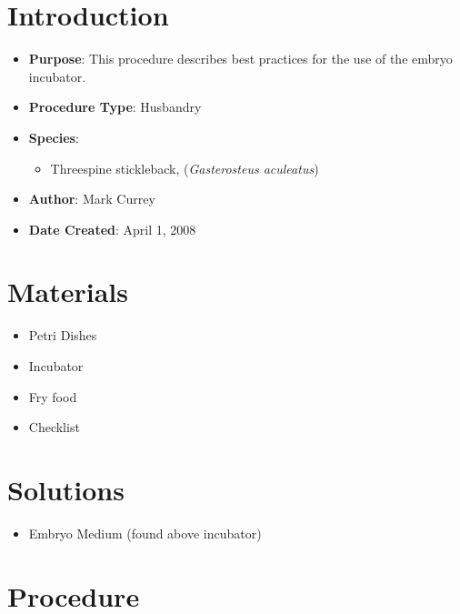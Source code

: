 \documentclass[
  letterpaper,
  DIV=11,
  numbers=noendperiod]{scrreprt}
\providecommand{\tightlist}{%
  \setlength{\itemsep}{0pt}\setlength{\parskip}{0pt}}\usepackage{longtable,booktabs,array}
\begin{document}
\hypertarget{introduction-42}{%
\section{Introduction}\label{introduction-42}}

\begin{itemize}
\tightlist
\item
  \textbf{Purpose}: This procedure describes best practices for the use
  of the embryo incubator.
\item
  \textbf{Procedure Type}: Husbandry
\item
  \textbf{Species}:

  \begin{itemize}
  \tightlist
  \item
    Threespine stickleback, (\emph{Gasterosteus aculeatus})
  \end{itemize}
\item
  \textbf{Author}: Mark Currey
\item
  \textbf{Date Created}: April 1, 2008
\end{itemize}

\hypertarget{materials-40}{%
\section{Materials}\label{materials-40}}

\begin{itemize}
\tightlist
\item
  Petri Dishes
\item
  Incubator
\item
  Fry food
\item
  Checklist
\end{itemize}

\hypertarget{solutions-32}{%
\section{Solutions}\label{solutions-32}}

\begin{itemize}
\tightlist
\item
  Embryo Medium (found above incubator)
\end{itemize}

\hypertarget{procedure-41}{%
\section{Procedure}\label{procedure-41}}
\end{document}
